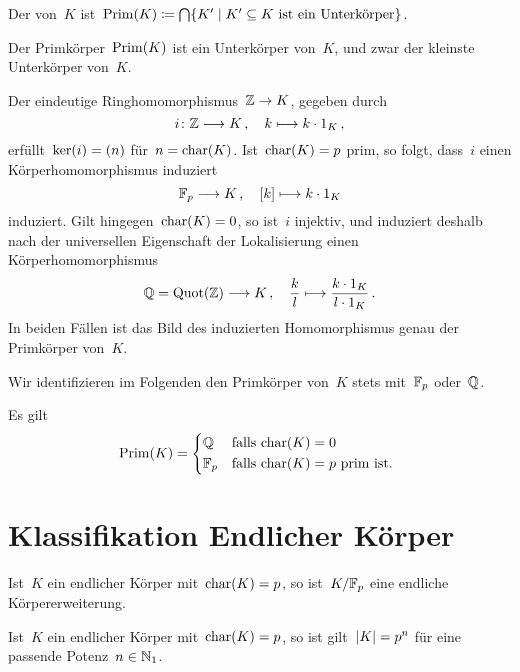 \begin{definition}
  Der  von~$K$ ist~$\Prim(K) \defined \bigcap \{ K' \suchthat \text{$K' \subseteq K$ ist ein Unterkörper} \}$.
\end{definition}

\begin{proposition}
  Der Primkörper~$\operatorname{Prim}(K)$ ist ein Unterkörper von~$K$, und zwar der kleinste Unterkörper von~$K$.
\end{proposition}

Der eindeutige Ringhomomorphismus~$\Integer \to K$, gegeben durch
\[
  i
  \colon
  \Integer \to K \,,
  \quad
  k \mapsto k \cdot 1_K \,,
\]
erfüllt~$\ker(i) = (n)$ für~$n = \operatorname{char}(K)$.
Ist~$\operatorname{char}(K) = p$ prim, so folgt, dass~$i$ einen Körperhomomorphismus induziert
\[
  \Finite_p \to K \,,
  \quad
  \class{k} \mapsto k \cdot 1_K
\]
induziert.
Gilt hingegen~$\operatorname{char}(K) = 0$, so ist~$i$ injektiv, und induziert deshalb nach der universellen Eigenschaft der Lokalisierung einen Körperhomomorphismus
\[
  \Rational
  =
  \Quot( \Integer )
  \to
  K \,,
  \quad
  \frac{k}{l}
  \mapsto
  \frac{k \cdot 1_K}{l \cdot 1_K} \,.
\]
In beiden Fällen ist das Bild des induzierten Homomorphismus genau der Primkörper von~$K$.

Wir identifizieren im Folgenden den Primkörper von~$K$ stets mit~$\mathbb{F}_p$ oder~$\mathbb{Q}$.

\begin{corollary}
  Es gilt
  \[
    \Prim(K)
    =
    \begin{cases*}
      \Rational
      &
      falls~$\ringchar(K) = 0$
      \\
      \Finite_p
      &
      falls~$\ringchar(K) = p$ prim ist.
    \end{cases*}
  \]
\end{corollary}





\section{Klassifikation Endlicher Körper}

Ist~$K$ ein endlicher Körper mit~$\operatorname{char}(K) = p$, so ist~$K / \mathbb{F}_p$ eine endliche Körpererweiterung.

\begin{proposition}
  Ist~$K$ ein endlicher Körper mit~$\operatorname{char}(K) = p$, so ist gilt~$\lvert K\rvert = p^n$ für eine passende Potenz~$n \in \mathbb{N}_1$.
\end{proposition}

